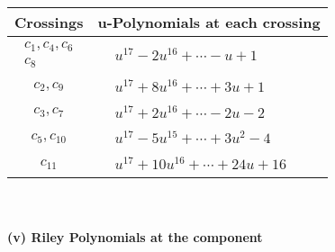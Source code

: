 \documentclass[1p]{elsarticle_modified}
\theoremstyle{definition}
\begin{document}
\begin{tabular}{m{50pt}|m{274pt}}
Crossings & \hspace{64pt}u-Polynomials at each crossing \\
\hline $$\begin{aligned}c_{1},c_{4},c_{6}\\c_{8}\end{aligned}$$&$\begin{aligned}
&u^{17}-2 u^{16}+\cdots- u+1
\end{aligned}$\\
\hline $$\begin{aligned}c_{2},c_{9}\end{aligned}$$&$\begin{aligned}
&u^{17}+8 u^{16}+\cdots+3 u+1
\end{aligned}$\\
\hline $$\begin{aligned}c_{3},c_{7}\end{aligned}$$&$\begin{aligned}
&u^{17}+2 u^{16}+\cdots-2 u-2
\end{aligned}$\\
\hline $$\begin{aligned}c_{5},c_{10}\end{aligned}$$&$\begin{aligned}
&u^{17}-5 u^{15}+\cdots+3 u^2-4
\end{aligned}$\\
\hline $$\begin{aligned}c_{11}\end{aligned}$$&$\begin{aligned}
&u^{17}+10 u^{16}+\cdots+24 u+16
\end{aligned}$\\
\hline
\end{tabular}\\~\\
\newpage\renewcommand{\arraystretch}{1}
\flushleft \textbf{(v) Riley Polynomials at the component}\newline \\
\end{document}
